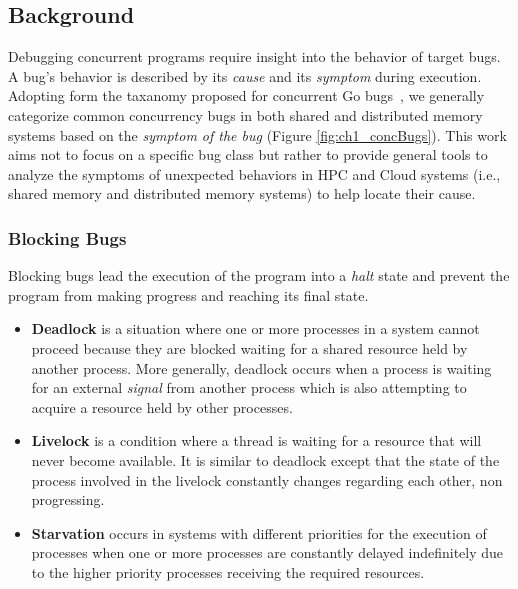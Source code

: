 \subsection{Background}
Debugging concurrent programs require insight into the behavior of target bugs.
%
A bug's behavior is described by its \textit{cause} and its \textit{symptom} during execution.
%
Adopting form the taxanomy proposed for concurrent Go bugs~\cite{tu-concurrentBugs-asplos19}, we generally categorize common concurrency bugs in both shared and distributed memory systems based on the \textit{symptom of the bug} (Figure \ref{fig:ch1_concBugs}).
%
This work aims not to focus on a specific bug class but rather to provide general tools to analyze the symptoms of unexpected behaviors in HPC and Cloud systems (i.e., shared memory and distributed memory systems) to help locate their cause.

\subsubsection{Blocking Bugs}
Blocking bugs lead the execution of the program into a \textit{halt} state and prevent the program from making progress and reaching its final state.

\begin{itemize}
  \item \textbf{Deadlock} is a situation where one or more processes in a system cannot proceed because they are blocked waiting for a shared resource held by another process. More generally, deadlock occurs when a process is waiting for an external \textit{signal} from another process which is also attempting to acquire a resource held by other processes.
  \item \textbf{Livelock} is a condition where a thread is waiting for a resource that will never become available. It is similar to deadlock except that the state of the process involved in the livelock constantly changes regarding each other, non progressing.
  \item  \textbf{Starvation} occurs in systems with different priorities for the execution of processes when one or more processes are constantly delayed indefinitely due to the higher priority processes receiving the required resources.
\end{itemize}


